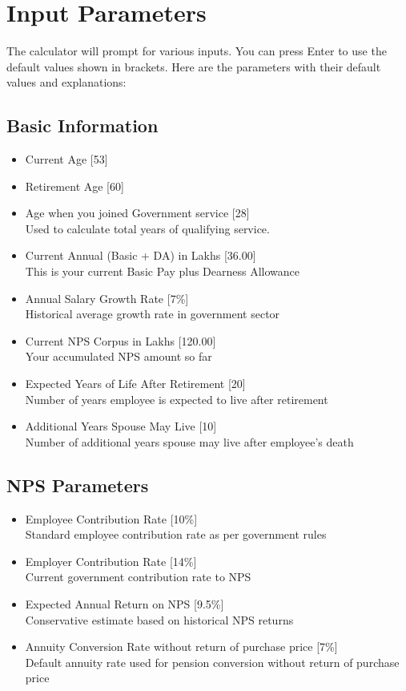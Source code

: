 \documentclass{article}
\begin{document}
\section{Input Parameters}
The calculator will prompt for various inputs. You can press Enter to use the default values shown in brackets. Here are the parameters with their default values and explanations:

\subsection{Basic Information}
\begin{itemize}
    \item Current Age [53]
    \item Retirement Age [60]
    \item Age when you joined Government service [28] \\
          Used to calculate total years of qualifying service.
    \item Current Annual (Basic + DA) in Lakhs [36.00] \\
          This is your current Basic Pay plus Dearness Allowance
    \item Annual Salary Growth Rate [7\%] \\
          Historical average growth rate in government sector
    \item Current NPS Corpus in Lakhs [120.00] \\
          Your accumulated NPS amount so far
    \item Expected Years of Life After Retirement [20] \\
          Number of years employee is expected to live after retirement
    \item Additional Years Spouse May Live [10] \\
          Number of additional years spouse may live after employee's death
\end{itemize}

\subsection{NPS Parameters}
\begin{itemize}
    \item Employee Contribution Rate [10\%] \\
          Standard employee contribution rate as per government rules
    \item Employer Contribution Rate [14\%] \\
          Current government contribution rate to NPS
    \item Expected Annual Return on NPS [9.5\%] \\
          Conservative estimate based on historical NPS returns
    \item Annuity Conversion Rate without return of purchase price [7\%] \\
          Default annuity rate used for pension conversion without return of purchase price
\end{itemize}
\end{document}
